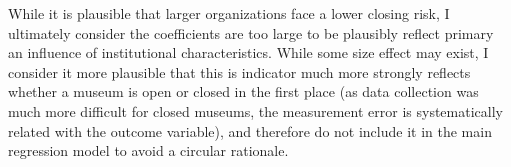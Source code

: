 \documentclass[12pt]{article}
\begin{document}
While it is plausible that larger organizations face a lower closing risk, I ultimately consider the coefficients are too large to be plausibly reflect primary an influence of institutional characteristics.
While some size effect may exist, I consider it more plausible that this is indicator much more strongly reflects whether a museum is open or closed in the first place (as data collection was much more difficult for closed museums, the  measurement error is systematically related with the outcome variable), and therefore do not include it in the main regression model to avoid a circular rationale.
\end{document}
